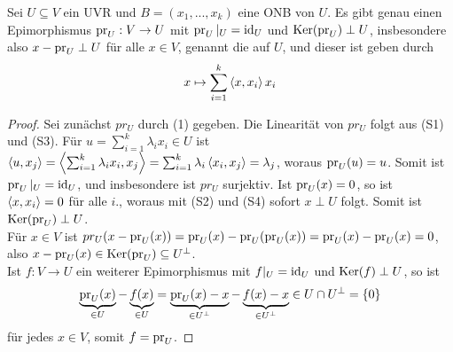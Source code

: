 \begin{proposition}
	Sei $U\subseteq V$ ein UVR und $B=(x_1,...,x_k)$ eine ONB von $U$. Es gibt genau einen Epimorphismus $\operatorname{pr}_U:V\to U$ mit $\operatorname{pr}_U\vert_U=\operatorname{id}_U$ und $\operatorname{Ker}(\operatorname{pr}_U)\perp U$, insbesondere also $x-\operatorname{pr}_U\perp U$ für alle $x\in V$, genannt die  auf $U$, und dieser ist geben durch
	\begin{align}
		x\mapsto\sum_{i=1}^k \left\langle x,x_i\right\rangle x_i
	\end{align}
\end{proposition}
\begin{proof}
	Sei zunächst $pr_U$ durch (1) gegeben. Die Linearität von $pr_U$ folgt aus (S1) und (S3). Für $u=\sum_{i=1}^k \lambda_i x_i\in U$ ist $\left\langle u,x_j\right\rangle=\left\langle \sum_{i=1}^k \lambda_i x_i,x_j\right\rangle=\sum_{i=1}^k \lambda_i\left\langle x_i,x_j\right\rangle=\lambda_j$, woraus $\operatorname{pr}_U(u)=u$. Somit ist $\operatorname{pr}_U\vert_U=\operatorname{id}_U$, und insbesondere ist $pr_U$ surjektiv. Ist $\operatorname{pr}_U(x)=0$, so ist $\left\langle x,x_i\right\rangle=0$ für alle $i$., woraus mit (S2) und (S4) sofort $x\perp U$ folgt. Somit ist $\operatorname{Ker}(\operatorname{pr}_U)\perp U$. \\
	Für $x\in V$ ist $pr_U(x-\operatorname{pr}_U(x))=\operatorname{pr}_U(x)-\operatorname{pr}_U(\operatorname{pr}_U(x))=\operatorname{pr}_U(x)-\operatorname{pr}_U(x)=0$, also $x-\operatorname{pr}_U(x)\in\operatorname{Ker}(\operatorname{pr}_U)\subseteq U^\perp$. \\
	Ist $f:V\to U$ ein weiterer Epimorphismus mit $f\vert_U=\operatorname{id}_U$ und $\operatorname{Ker}(f)\perp U$, so ist 
	\begin{align}
		\underbrace{\operatorname{pr}_U(x)}_{\in U}-\underbrace{f(x)}_{\in U}=\underbrace{\operatorname{pr}_U(x)-x}_{\in U^\perp}-\underbrace{f(x)-x}_{\in U^\perp}\in U\cap U^\perp =\{0\}\notag
	\end{align}
	für jedes $x\in V$, somit $f=\operatorname{pr}_U$.
\end{proof}